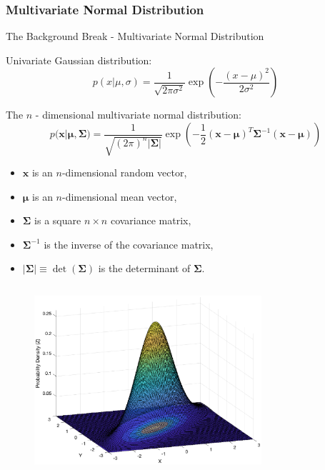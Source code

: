 \subsubsection{Multivariate Normal Distribution}
\begin{frame}{The Background Break - Multivariate Normal Distribution}

Univariate Gaussian distribution:
$$p(x|\mu, \sigma) = \frac{1}{\sqrt{2\pi\sigma^2}} \exp\left(-\frac{(x - \mu)^2}{2\sigma^2}\right)$$

The $n$ - dimensional multivariate normal distribution:
$$p(\mathbf{x}|\boldsymbol{\mu},\mathbf{\Sigma)} = \frac{1}{\sqrt{(2\pi)^n |\mathbf{\Sigma}|}} \exp\left(-\frac{1}{2}(\mathbf{x} - \boldsymbol{\mu})^T \mathbf{\Sigma}^{-1} (\mathbf{x} - \boldsymbol{\mu})\right)$$
\begin{itemize}
    \item $\mathbf{x}$ is an \(n\)-dimensional random vector,
    \item $\boldsymbol{\mu}$ is an \(n\)-dimensional mean vector,
    \item $\boldsymbol{\Sigma}$ is a square \(n \times n\) covariance matrix,
    \item $\boldsymbol{\Sigma}^{-1}$ is the inverse of the covariance matrix,
    \item $|\boldsymbol{\Sigma}| \equiv \det(\boldsymbol{\Sigma})$ is the determinant of ${\boldsymbol {\Sigma }}$.
\end{itemize}
\vspace{-10pt}
\begin{columns}
            \begin{figure}
    \centering
    \includegraphics[width=0.75\textwidth]{Figures/Background2/GaussuanSurface_Corr_0.8.eps}
        \vspace{-10pt}

\end{figure}
\end{columns}
\end{frame}
